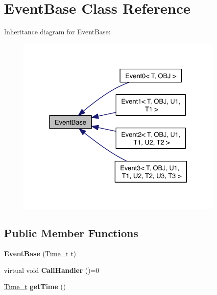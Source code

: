 \hypertarget{class_event_base}{\section{Event\-Base Class Reference}
\label{class_event_base}
}


Inheritance diagram for Event\-Base\-:\nopagebreak
\begin{figure}[H]
\begin{center}
\leavevmode
\includegraphics[width=290pt]{class_event_base__inherit__graph}
\end{center}
\end{figure}
\subsection*{Public Member Functions}
\begin{DoxyCompactItemize}
\item 
\hypertarget{class_event_base_a69050713e15086d940248753af41b50f}{{\bfseries Event\-Base} (\hyperlink{_common_defs_8h_a80b23eab88362163e2edd1a8b8238ef1}{Time\-\_\-t} t)}\label{class_event_base_a69050713e15086d940248753af41b50f}

\item 
\hypertarget{class_event_base_a121ca64dec88c8d9589c064b0060d037}{virtual void {\bfseries Call\-Handler} ()=0}\label{class_event_base_a121ca64dec88c8d9589c064b0060d037}

\item 
\hypertarget{class_event_base_abf175c0914e2ac5f5d5454868c676959}{\hyperlink{_common_defs_8h_a80b23eab88362163e2edd1a8b8238ef1}{Time\-\_\-t} {\bfseries get\-Time} ()}\label{class_event_base_abf175c0914e2ac5f5d5454868c676959}

\end{DoxyCompactItemize}
